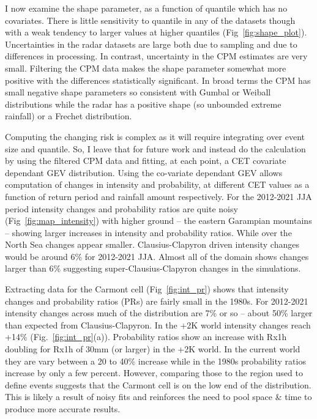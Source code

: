 \documentclass[11pt,a4paper]{article}
\begin{document}
I now examine the shape parameter, as a function of quantile which  has no covariates.  There is little sensitivity to quantile in any of the datasets though with a weak tendency to larger values at higher quantiles (Fig~\ref{fig:shape_plot}).  Uncertainties in the radar datasets are large both due to sampling and due to differences in processing. In contrast, uncertainty in the CPM estimates are very small. Filtering the CPM data makes the shape parameter somewhat more positive with the differences statistically significant. In broad terms the CPM has small negative  shape parameters so consistent with Gumbal or Weiball distributions while the radar has a positive shape (so unbounded extreme rainfall)  or a Frechet distribution. 

Computing the changing risk is complex as it will require integrating over event size and quantile. So, I leave that for future work  and instead do the  calculation by using the  filtered CPM data and fitting, at each point, a CET covariate dependant GEV distribution.  Using the co-variate dependant GEV allows computation of changes in intensity and probability, at different CET values as a function of return period and  rainfall amount respectively. For the 2012-2021 JJA period intensity changes and probability ratios are quite noisy (Fig~\ref{fig:map_intensity}) with higher ground -- the eastern Garampian mountains  -- showing larger increases in intensity and probability ratios. While over the North Sea changes appear smaller. Clausius-Clapyron driven intensity changes would be around 6\% for 2012-2021 JJA. Almost all of the domain shows changes larger than 6\% suggesting super-Clausius-Clapyron changes in the simulations. 

Extracting data for the Carmont cell (Fig~\ref{fig:int_pr}) shows that intensity changes and probability ratios (PRs) are fairly small in the 1980s. For 2012-2021 intensity changes across much of the distribution are 7\% or so -- about 50\% larger than expected from Clausius-Clapyron. In the +2K world intensity changes reach +14\% (Fig.~\ref{fig:int_pr}(a)). Probability ratios show an increase with Rx1h 
doubling for Rx1h of 30mm (or larger) in the +2K world. In the current world they are vary between a  20 to 40\% increase while in the 1980s probability ratios increase by only a few percent.  However, comparing those to the region used to define events suggests that the Carmont cell is on the low end of the distribution. This is likely a result of noisy fits and reinforces the need to pool space \& time to produce more accurate results. 
\end{document}
